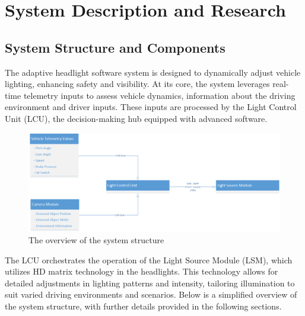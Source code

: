 \chapter{System Description and Research}

\section{System Structure and Components}

The adaptive headlight software system is designed to dynamically adjust vehicle lighting, enhancing safety and visibility. At its core, the system leverages real-time telemetry inputs to assess vehicle dynamics, information about the driving environment  and driver inputs. These inputs are processed by the Light Control Unit (LCU), the decision-making hub equipped with advanced software.
\begin{figure}[h!]
    \centering
    \includegraphics[width=0.75\linewidth]{Grafik/Overview_system_structure.png}
    \caption{The overview of the system structure}
    \label{fig:enter-label}
\end{figure}
The LCU orchestrates the operation of the Light Source Module (LSM), which utilizes HD matrix technology in the headlights. This technology allows for detailed adjustments in lighting patterns and intensity, tailoring illumination to suit varied driving environments and scenarios. Below is a simplified overview of the system structure, with further details provided in the following sections.
